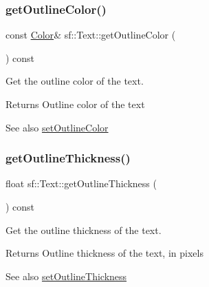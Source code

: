 \subsubsection{\texorpdfstring{getOutlineColor()}{getOutlineColor()}}
{\footnotesize\ttfamily const \mbox{\hyperlink{classsf_1_1_color}{Color}}\& sf\+::\+Text\+::get\+Outline\+Color (\begin{DoxyParamCaption}{ }\end{DoxyParamCaption}) const}



Get the outline color of the text. 

\begin{DoxyReturn}{Returns}
Outline color of the text
\end{DoxyReturn}
\begin{DoxySeeAlso}{See also}
\mbox{\hyperlink{classsf_1_1_text_aa19ec69c3b894e963602a6804ca68fe4}{set\+Outline\+Color}} \begin{DoxyVerb}\end{DoxyVerb}
 
\end{DoxySeeAlso}
\mbox{\label{classsf_1_1_text_af6bf01c23189edf52c8b38708db6f3f6}} 
\subsubsection{\texorpdfstring{getOutlineThickness()}{getOutlineThickness()}}
{\footnotesize\ttfamily float sf\+::\+Text\+::get\+Outline\+Thickness (\begin{DoxyParamCaption}{ }\end{DoxyParamCaption}) const}



Get the outline thickness of the text. 

\begin{DoxyReturn}{Returns}
Outline thickness of the text, in pixels
\end{DoxyReturn}
\begin{DoxySeeAlso}{See also}
\mbox{\hyperlink{classsf_1_1_text_ab0e6be3b40124557bf53737fe6a6ce77}{set\+Outline\+Thickness}} \begin{DoxyVerb}\end{DoxyVerb}
 
\end{DoxySeeAlso}
\mbox{\label{classsf_1_1_text_a084c275eb4bca835696af5f8f9c80ab3}} 

